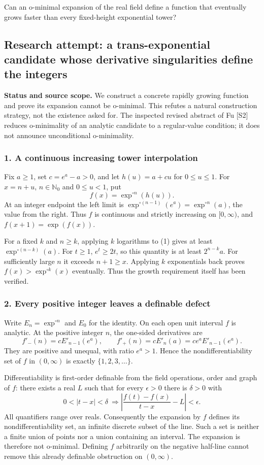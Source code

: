 \documentclass[11pt,a4paper]{article}
\begin{document}
Can an o-minimal expansion of the real field define a function that eventually grows faster than every fixed-height exponential tower?

\subsection{Research attempt: a trans-exponential candidate whose derivative singularities define the integers}
\textbf{Status and source scope.} We construct a concrete rapidly growing function and prove its expansion cannot be o-minimal. This refutes a natural construction strategy, not the existence asked for. The inspected revised abstract of Fu [S2] reduces o-minimality of an analytic candidate to a regular-value condition; it does not announce unconditional o-minimality.

\subsubsection{1. A continuous increasing tower interpolation}
Fix $a\geq1$, set $c=e^a-a>0$, and let $h(u)=a+cu$ for $0\leq u\leq1$. For $x=n+u$, $n\in\mathbb N_0$ and $0\leq u<1$, put
\[f(x)=\exp^{\circ n}(h(u)).\tag{1}\]
At an integer endpoint the left limit is $\exp^{\circ(n-1)}(e^a)=\exp^{\circ n}(a)$, the value from the right. Thus $f$ is continuous and strictly increasing on $[0,\infty)$, and $f(x+1)=\exp(f(x))$.

For a fixed $k$ and $n\geq k$, applying $k$ logarithms to (1) gives at least $\exp^{\circ(n-k)}(a)$. For $t\geq1$, $e^t\geq2t$, so this quantity is at least $2^{n-k}a$. For sufficiently large $n$ it exceeds $n+1\geq x$. Applying $k$ exponentials back proves $f(x)>\exp^{\circ k}(x)$ eventually. Thus the growth requirement itself has been verified.

\subsubsection{2. Every positive integer leaves a definable defect}
Write $E_n=\exp^{\circ n}$ and $E_0$ for the identity. On each open unit interval $f$ is analytic. At the positive integer $n$, the one-sided derivatives are
\[f'_-(n)=cE'_{n-1}(e^a),\qquad
f'_+(n)=cE'_n(a)=ce^a E'_{n-1}(e^a).
\]
They are positive and unequal, with ratio $e^a>1$. Hence the nondifferentiability set of $f$ in $(0,\infty)$ is exactly $\{1,2,3,\ldots\}$.

Differentiability is first-order definable from the field operations, order and graph of $f$: there exists a real $L$ such that for every $\epsilon>0$ there is $\delta>0$ with
\[0<|t-x|<\delta\ \Longrightarrow
\left|\frac{f(t)-f(x)}{t-x}-L\right|<\epsilon.
\]
All quantifiers range over reals. Consequently the expansion by $f$ defines its nondifferentiability set, an infinite discrete subset of the line. Such a set is neither a finite union of points nor a union containing an interval. The expansion is therefore not o-minimal. Defining $f$ arbitrarily on the negative half-line cannot remove this already definable obstruction on $(0,\infty)$.
\end{document}
